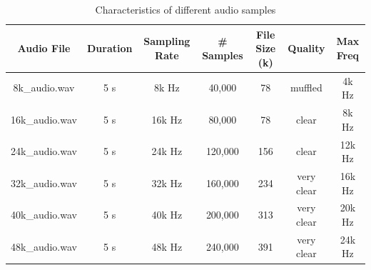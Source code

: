 \documentclass[11pt, oneside]{article}   	%
\begin{document}
\begin{table}[ht]
\centering
\caption{Characteristics of different audio samples}
\label{tab:compare}
\begin{tabular}{|c|c|c|c|c|c|c|}
\hline
Audio File & Duration & Sampling Rate & \# Samples & File Size (k) & Quality & Max Freq\\
\hline
\hline
8k\_audio.wav & 5 s & 8k Hz & 40,000  & 78 & muffled & 4k Hz\\
16k\_audio.wav & 5 s & 16k Hz & 80,000  & 78 & clear & 8k Hz\\
24k\_audio.wav & 5 s & 24k Hz & 120,000  & 156 & clear & 12k Hz\\
32k\_audio.wav & 5 s & 32k Hz & 160,000  & 234 & very clear & 16k Hz\\
40k\_audio.wav & 5 s & 40k Hz & 200,000  & 313 & very clear & 20k Hz\\
48k\_audio.wav & 5 s & 48k Hz & 240,000  & 391 & very clear & 24k Hz\\
\hline
\end{tabular}
\end{table}
\end{document}
